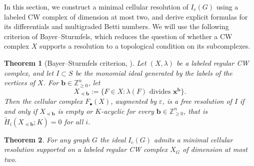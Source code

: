\documentclass[12pt]{amsart}
\newtheorem{Theorem}{Theorem}[section]
\begin{document}
In this section, we construct a minimal cellular resolution of $I_c(G)$ using a labeled CW complex of dimension at most two, and derive explicit formulas for its differentials and multigraded Betti numbers.
We will use the following criterion of Bayer--Sturmfels, which reduces the question of whether a CW complex $X$ supports a resolution to a topological condition on its subcomplexes.

\begin{Theorem}[Bayer--Sturmfels criterion, {\cite[Proposition 1.2]{bs1998}}]\label{thm:bs}
Let $(X,\lambda)$ be a labeled regular CW complex, and let $I\subset S$ be the monomial ideal generated by the labels of the vertices of $X$. For $\mathbf b\in\mathbb Z_{\ge0}^n$, let
\[
X_{\preceq \mathbf b} := \{F \in X : \lambda(F) \text{ divides } \mathbf x^{\mathbf b}\}.
\]
Then the cellular complex $F_\bullet(X)$, augmented by $\varepsilon$, is a free resolution of $I$ if and only if $X_{\preceq \mathbf b}$ is empty or $K$-acyclic  for every $\mathbf b\in\mathbb Z_{\ge0}^n$, that is $\widetilde H_i(X_{\preceq\mathbf b};K)=0$ for all $i$.
\end{Theorem}


	
			
			 
\begin{Theorem}\label{thm:cellular-res}
				For any graph $G$ the ideal $I_c(G)$ admits a minimal cellular resolution supported on a labeled regular CW complex $X_G$ of dimension at most two.
			\end{Theorem}
			
\end{document}
